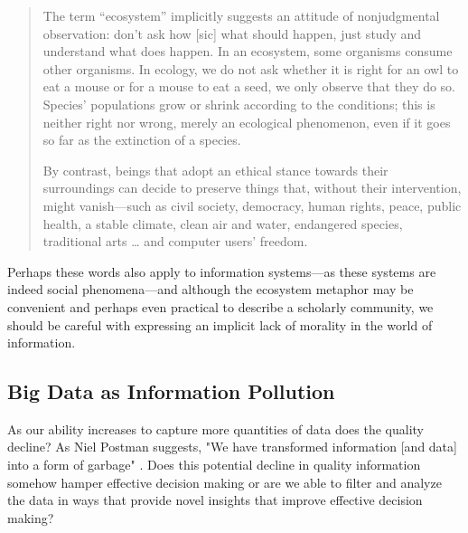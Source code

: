 \begin{quote}
The term “ecosystem” implicitly suggests an attitude of nonjudgmental observation: don't ask how [sic] what should happen, just study and understand what does happen. In an ecosystem, some organisms consume other organisms. In ecology, we do not ask whether it is right for an owl to eat a mouse or for a mouse to eat a seed, we only observe that they do so. Species' populations grow or shrink according to the conditions; this is neither right nor wrong, merely an ecological phenomenon, even if it goes so far as the extinction of a species.

By contrast, beings that adopt an ethical stance towards their surroundings can decide to preserve things that, without their intervention, might vanish—such as civil society, democracy, human rights, peace, public health, a stable climate, clean air and water, endangered species, traditional arts … and computer users' freedom. \citep{fsf_2014}
\end{quote}

Perhaps these words also apply to information systems—as these systems are indeed social phenomena—and although the ecosystem metaphor may be convenient and perhaps even practical to describe a scholarly community, we should be careful with expressing an implicit lack of morality in the world of information. 

\subsection{Big Data as Information Pollution}

As our ability increases to capture more quantities of data does the quality decline? As Niel Postman suggests, "We have transformed information [and data] into a form of garbage" \citep[cited in][p. 50]{stepp_1999}. Does this potential decline in quality information somehow hamper effective decision making or are we able to filter and analyze the data in ways that provide novel insights that improve effective decision making?



